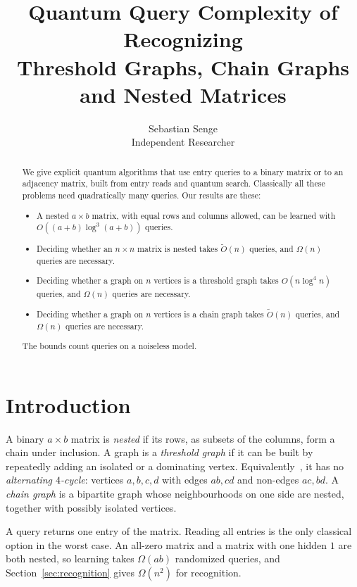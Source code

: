 \documentclass[11pt]{article}
\title{Quantum Query Complexity of Recognizing\\ Threshold Graphs, Chain Graphs and Nested Matrices}
\author{Sebastian Senge\\ Independent Researcher}
\date{}
\theoremstyle{remark}
\newcommand{\Ot}{\tilde O}
\begin{document}
\maketitle

\begin{abstract}
We give explicit quantum algorithms that use entry queries to a binary matrix or to an adjacency matrix, built from entry reads and quantum search. Classically all these problems need quadratically many queries. Our results are these:
\begin{itemize}[leftmargin=1.5em]
\item A nested $a\times b$ matrix, with equal rows and columns allowed, can be learned with $O((a+b)\log^3(a+b))$ queries.
\item Deciding whether an $n\times n$ matrix is nested takes $\Ot(n)$ queries, and $\Omega(n)$ queries are necessary.
\item Deciding whether a graph on $n$ vertices is a threshold graph takes $O(n\log^4 n)$ queries, and $\Omega(n)$ queries are necessary.
\item Deciding whether a graph on $n$ vertices is a chain graph takes $\Ot(n)$ queries, and $\Omega(n)$ queries are necessary.
\end{itemize}
The bounds count queries on a noiseless model.
\end{abstract}

\section{Introduction}

A binary $a\times b$ matrix is \emph{nested} if its rows, as subsets of the columns, form a chain under inclusion. A graph is a \emph{threshold graph} if it can be built by repeatedly adding an isolated or a dominating vertex. Equivalently~\cite{CH77}, it has no \emph{alternating $4$-cycle}: vertices $a,b,c,d$ with edges $ab,cd$ and non-edges $ac,bd$. A \emph{chain graph} is a bipartite graph whose neighbourhoods on one side are nested, together with possibly isolated vertices.

A query returns one entry of the matrix. Reading all entries is the only classical option in the worst case. An all-zero matrix and a matrix with one hidden $1$ are both nested, so learning takes $\Omega(ab)$ randomized queries, and Section~\ref{sec:recognition} gives $\Omega(n^2)$ for recognition.
\end{document}
